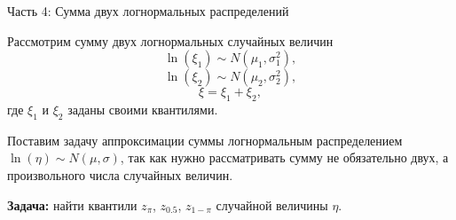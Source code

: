 \documentclass[ucs, notheorems, handout]{beamer}
\begin{document}
	
	\begin{frame}{Часть 4: Сумма двух логнормальных распределений }
		
		Рассмотрим сумму двух логнормальных случайных величин
		\begin{equation*}
			\ln(\xi_{1}) \sim N(\mu_{1}, \sigma _{1}^{2}),
		\end{equation*}
		\begin{equation*}
			\ln(\xi_{2}) \sim N(\mu_{2}, \sigma _{2}^{2}),
		\end{equation*}
		\begin{equation*}
			\xi = \xi_{1}+\xi_{2},
		\end{equation*}
		где $\xi_{1}$ и $\xi_{2}$ заданы своими квантилями.
		\bigskip
		
		Поставим задачу аппроксимации суммы логнормальным распределением $\ln(\eta)\sim N(\mu, \sigma)$, так как нужно рассматривать сумму не обязательно двух, а произвольного числа случайных величин. 
		
		\bigskip
		
		\textbf{Задача:} найти квантили $z_{\pi}$, $z_{0.5}$, $z_{1-\pi}$ случайной величины $\eta$.
		
		
		
	\end{frame}
	
\end{document}
